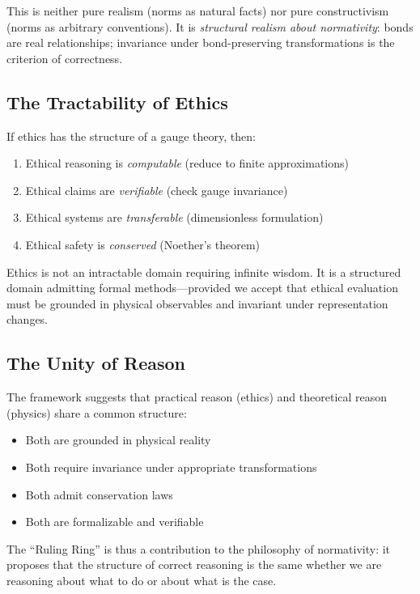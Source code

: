 \documentclass[12pt]{article}
\begin{document}
This is neither pure realism (norms as natural facts) nor pure constructivism (norms as arbitrary conventions). It is \textit{structural realism about normativity}: bonds are real relationships; invariance under bond-preserving transformations is the criterion of correctness.

\subsection{The Tractability of Ethics}

If ethics has the structure of a gauge theory, then:

\begin{enumerate}
    \item Ethical reasoning is \textit{computable} (reduce to finite approximations)
    \item Ethical claims are \textit{verifiable} (check gauge invariance)
    \item Ethical systems are \textit{transferable} (dimensionless formulation)
    \item Ethical safety is \textit{conserved} (Noether's theorem)
\end{enumerate}

Ethics is not an intractable domain requiring infinite wisdom. It is a structured domain admitting formal methods---provided we accept that ethical evaluation must be grounded in physical observables and invariant under representation changes.

\subsection{The Unity of Reason}

The framework suggests that practical reason (ethics) and theoretical reason (physics) share a common structure:

\begin{itemize}
    \item Both are grounded in physical reality
    \item Both require invariance under appropriate transformations
    \item Both admit conservation laws
    \item Both are formalizable and verifiable
\end{itemize}

The ``Ruling Ring'' is thus a contribution to the philosophy of normativity: it proposes that the structure of correct reasoning is the same whether we are reasoning about what to do or about what is the case.
\end{document}
